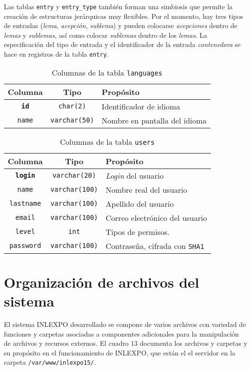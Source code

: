 \documentclass[11pt]{article} %
\begin{document}
Las tablas \texttt{entry} y \texttt{entry\_type} también forman una simbiosis que permite la creación de estructuras jerárquicas muy flexibles.  Por el momento, hay tres tipos de entradas (\textit{lema}, \textit{acepción}, \textit{sublema}) y pueden colocarse \textit{acepciones} dentro de \textit{lemas} y \textit{sublemas}, así como colocar  \textit{sublemas} dentro de los \textit{lemas}.  La especificación del tipo de entrada y el identificador de la entrada \textit{contenedora} se hace en registros de la tabla \texttt{entry}.

\begin{table}
\centering
\begin{tabular}{ccp{6cm}} 
\toprule 
Columna & Tipo &Propósito \\ \midrule 
\texttt{\bf id} &\texttt{char(2)} & Identificador de idioma \\ 
\texttt{name} &\texttt{varchar(50)} &  Nombre en pantalla del idioma \\ 
\bottomrule 
\end{tabular}
\caption{Columnas de la tabla \texttt{languages}}
\end{table}

\begin{table}
\centering
\begin{tabular}{ccp{6cm}} 
\toprule 
Columna & Tipo &Propósito \\ \midrule 
\texttt{\bf login} &\texttt{varchar(20)} & \textit{Login} del usuario \\ 
\texttt{name} &\texttt{varchar(100)} &  Nombre real del usuario\\ 
\texttt{lastname} &\texttt{varchar(100)} &  Apellido del usuario \\ 
\texttt{email} &\texttt{varchar(100)} &  Correo electrónico del usuario\\ 
\texttt{level} &\texttt{int} &  Tipos de permisos.\\ 
\texttt{password} &\texttt{varchar(100)} &  Contraseña, cifrada con \texttt{SHA1}\\ 
\bottomrule 
\end{tabular}
\caption{Columnas de la tabla \texttt{users}}
\end{table}

\section*{Organización de archivos del sistema}
El sistema INLEXPO desarrollado se compone de varios archivos con variedad de funciones y carpetas asociadas a componentes adicionales para la manipulación de archivos y recursos externos. El cuadro 13 documenta los archivos y carpetas y su propósito en el funcionamiento de INLEXPO, que están el el servidor en la carpeta \texttt{/var/www/inlexpo15/}.
\end{document}
